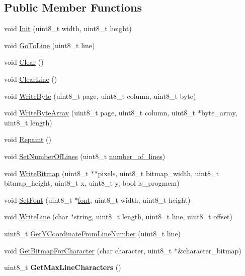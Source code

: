 \subsection*{Public Member Functions}
\begin{DoxyCompactItemize}
\item 
void \hyperlink{class_o_l_e_d_a2c8205c8eac9d7a2b181657561e9b4d2}{Init} (uint8\+\_\+t width, uint8\+\_\+t height)
\item 
void \hyperlink{class_o_l_e_d_a8d314130676b104ed959b92ab4bac25e}{Go\+To\+Line} (uint8\+\_\+t line)
\item 
void \hyperlink{class_o_l_e_d_a6c7bb1fc91b3e574a275f90643da140a}{Clear} ()
\item 
void \hyperlink{class_o_l_e_d_a3a571f5ea7a183fa14932cd5b2c423eb}{Clear\+Line} ()
\item 
void \hyperlink{class_o_l_e_d_a7fa307269dbd2e80a6e48a1442df83d2}{Write\+Byte} (uint8\+\_\+t page, uint8\+\_\+t column, uint8\+\_\+t byte)
\item 
void \hyperlink{class_o_l_e_d_a7fffc17a5439300d361414c15a7a2dbe}{Write\+Byte\+Array} (uint8\+\_\+t page, uint8\+\_\+t column, uint8\+\_\+t $\ast$byte\+\_\+array, uint8\+\_\+t length)
\item 
void \hyperlink{class_o_l_e_d_a3efa34861b4ae0bc5323f6b7cf1d8a01}{Repaint} ()
\item 
void \hyperlink{class_o_l_e_d_aa3c88e19f05340036ea5ac9e2d1ea5dc}{Set\+Number\+Of\+Lines} (uint8\+\_\+t \hyperlink{class_o_l_e_d_a9ea1c55112deede1a61142af276a6bc9}{number\+\_\+of\+\_\+lines})
\item 
void \hyperlink{class_o_l_e_d_a3cb468f16387343f6db387a86cded8af}{Write\+Bitmap} (uint8\+\_\+t $\ast$$\ast$pixels, uint8\+\_\+t bitmap\+\_\+width, uint8\+\_\+t bitmap\+\_\+height, uint8\+\_\+t x, uint8\+\_\+t y, bool is\+\_\+progmem)
\item 
void \hyperlink{class_o_l_e_d_abe6073c961cadc4c9b693eb8dc8198bd}{Set\+Font} (uint8\+\_\+t $\ast$\hyperlink{class_o_l_e_d_a29ab86a4a73f4d343bf1810927f0911d}{font}, uint8\+\_\+t width, uint8\+\_\+t height)
\item 
void \hyperlink{class_o_l_e_d_a0ffccb4fd874b997c869c5d511f76df8}{Write\+Line} (char $\ast$string, uint8\+\_\+t length, uint8\+\_\+t line, uint8\+\_\+t offset)
\item 
uint8\+\_\+t \hyperlink{class_o_l_e_d_a5b6d41d5d699998f54ea6e3b6562ac5b}{Get\+Y\+Coordinate\+From\+Line\+Number} (uint8\+\_\+t line)
\item 
void \hyperlink{class_o_l_e_d_a3bd2f2f05568441e1e0533eaf0db58f8}{Get\+Bitmap\+For\+Character} (char character, uint8\+\_\+t $\ast$\&character\+\_\+bitmap)
\item 
\hypertarget{class_o_l_e_d_a7bb08915b685741c60bdccdd47781560}{}\label{class_o_l_e_d_a7bb08915b685741c60bdccdd47781560} 
uint8\+\_\+t {\bfseries Get\+Max\+Line\+Characters} ()
\end{DoxyCompactItemize}
